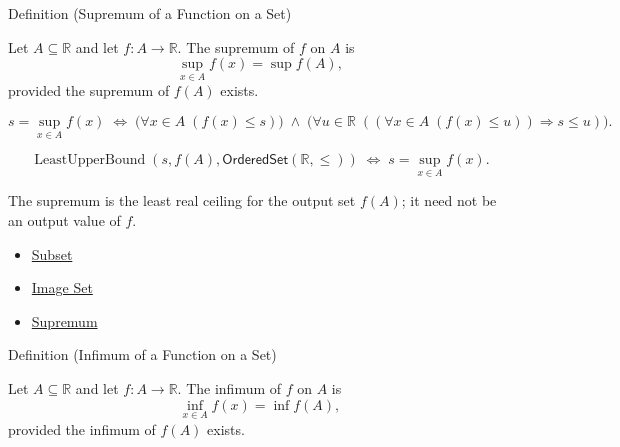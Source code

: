 
\begin{definitionbox}{Definition (Supremum of a Function on a Set)}
\begin{definition}
\label{def:function-supremum-on-set}
Let $A\subseteq\mathbb{R}$ and let $f:A\to\mathbb{R}$.  The supremum of
$f$ on $A$ is
\[
  \sup_{x\in A} f(x) = \sup f(A),
\]
provided the supremum of $f(A)$ exists.
\end{definition}
\end{definitionbox}

\begin{remark*}
\[
  s=\sup_{x\in A}f(x)
  \;\Longleftrightarrow\;
  \bigl(\forall x\in A\;(f(x)\leq s)\bigr)
  \;\wedge\;
  \bigl(\forall u\in\mathbb{R}\;((\forall x\in A\;(f(x)\leq u))\Rightarrow s\leq u)\bigr).
\]
\end{remark*}

\begin{remark*}
\[
  \operatorname{LeastUpperBound}(s,f(A),\mathsf{OrderedSet}(\mathbb{R},\leq))
  \;\Longleftrightarrow\;
  s=\sup_{x\in A}f(x).
\]
\end{remark*}

\begin{remark*}[Interpretation]
The supremum is the least real ceiling for the output set $f(A)$; it need
not be an output value of $f$.
\end{remark*}

\begin{dependencies}
\begin{itemize}
  \item \hyperref[def:subset]{Subset}
  \item \hyperref[def:image-set]{Image Set}
  \item \hyperref[def:supremum]{Supremum}
\end{itemize}
\end{dependencies}

\begin{definitionbox}{Definition (Infimum of a Function on a Set)}
\begin{definition}
\label{def:function-infimum-on-set}
Let $A\subseteq\mathbb{R}$ and let $f:A\to\mathbb{R}$.  The infimum of
$f$ on $A$ is
\[
  \inf_{x\in A} f(x) = \inf f(A),
\]
provided the infimum of $f(A)$ exists.
\end{definition}
\end{definitionbox}

